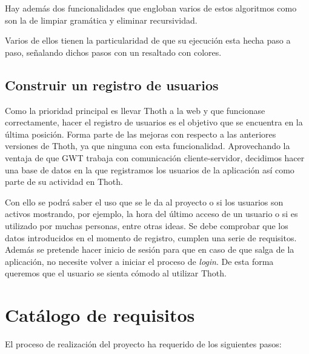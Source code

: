 Hay además dos funcionalidades que engloban varios de estos algoritmos como son la de limpiar gramática y eliminar recursividad.

Varios de ellos tienen la particularidad de que su ejecución esta hecha paso a paso, señalando dichos pasos con un resaltado con colores.

\subsection{Construir un registro de usuarios}

Como la prioridad principal es llevar Thoth a la web y que funcionase correctamente, hacer el registro de usuarios es el objetivo que se encuentra en la última posición. Forma parte de las mejoras con respecto a las anteriores versiones de Thoth, ya que ninguna con esta funcionalidad. Aprovechando la ventaja de que GWT trabaja con comunicación cliente-servidor, decidimos hacer una base de datos en la que registramos los usuarios de la aplicación así como parte de su actividad en Thoth.

Con ello se podrá saber el uso que se le da al proyecto o si los usuarios son activos mostrando, por ejemplo, la hora del último acceso de un usuario o si es utilizado por muchas personas, entre otras ideas. Se debe comprobar que los datos introducidos en el momento de registro, cumplen una serie de requisitos. Además se pretende hacer inicio de sesión para que en caso de que salga de la aplicación, no necesite volver a iniciar el proceso de \emph{login}. De esta forma queremos que el usuario se sienta cómodo al utilizar Thoth.
\section{Catálogo de requisitos}

El proceso de realización del proyecto ha requerido de los siguientes pasos:

